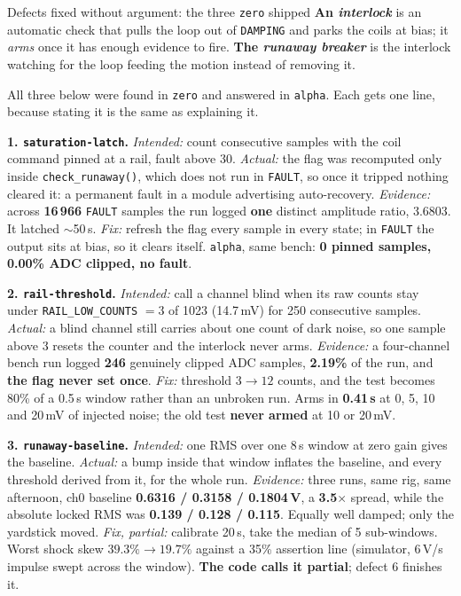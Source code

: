 \documentclass[aspectratio=169]{beamer}
\begin{document}
\begin{frame}{Defects fixed without argument: the three \texttt{zero} shipped}
  \scriptsize
  \textbf{An \emph{interlock}} is an automatic check that pulls the loop out of
  \texttt{DAMPING} and parks the coils at bias; it \emph{arms} once it has enough
  evidence to fire. \textbf{The \emph{runaway breaker}} is the interlock watching
  for the loop feeding the motion instead of removing it.
  
  All three below were found in \texttt{zero} and answered in \texttt{alpha}.
  Each gets one line, because stating it is the same as explaining it.

  \vspace{1mm}
  \textbf{1. \texttt{saturation-latch}.}
  \emph{Intended:} count consecutive samples with the coil command pinned at a
  rail, fault above 30.
  \emph{Actual:} the flag was recomputed only inside \texttt{check\_runaway()},
  which does not run in \texttt{FAULT}, so once it tripped nothing cleared it: a
  permanent fault in a module advertising auto-recovery.
  \emph{Evidence:} across \textbf{16\,966} \texttt{FAULT} samples the run logged
  \alert{\textbf{one} distinct amplitude ratio, 3.6803}. It latched $\sim$50\,s.
  \emph{Fix:} refresh the flag every sample in every state; in \texttt{FAULT} the
  output sits at bias, so it clears itself. \texttt{alpha}, same bench: \textbf{0
  pinned samples, 0.00\% ADC clipped, no fault}.

  \vspace{1mm}
  \textbf{2. \texttt{rail-threshold}.}
  \emph{Intended:} call a channel blind when its raw counts stay under
  \texttt{RAIL\_LOW\_COUNTS} $=3$ of 1023 (14.7\,mV) for 250 consecutive samples.
  \emph{Actual:} a blind channel still carries about one count of dark noise, so
  one sample above 3 resets the counter and the interlock never arms.
  \emph{Evidence:} a four-channel bench run logged \textbf{246} genuinely clipped
  ADC samples, \textbf{2.19\%} of the run, and \textbf{the flag never set once}.
  \emph{Fix:} threshold $3 \to 12$ counts, and the test becomes 80\% of a 0.5\,s
  window rather than an unbroken run. Arms in \textbf{0.41\,s} at 0, 5, 10 and
  20\,mV of injected noise; the old test \textbf{never armed} at 10 or 20\,mV.

  \vspace{1mm}
  \textbf{3. \texttt{runaway-baseline}.}
  \emph{Intended:} one RMS over one 8\,s window at zero gain gives the baseline.
  \emph{Actual:} a bump inside that window inflates the baseline, and every
  threshold derived from it, for the whole run.
  \emph{Evidence:} three runs, same rig, same afternoon, ch0 baseline
  \textbf{0.6316 / 0.3158 / 0.1804\,V}, a \textbf{3.5$\times$} spread, while the
  absolute locked RMS was \textbf{0.139 / 0.128 / 0.115}. Equally well damped;
  only the yardstick moved.
  \emph{Fix, partial:} calibrate 20\,s, take the median of 5 sub-windows. Worst
  shock skew $39.3\% \to \mathbf{19.7\%}$ against a 35\% assertion line
  (simulator, 6\,V/s impulse swept across the window). \textbf{The code calls it
  partial}; defect 6 finishes it.
\end{frame}
\end{document}
